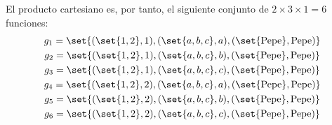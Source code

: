 \documentclass[fc]{tarea}
\begin{document}
\begin{tasks}
    El producto cartesiano es, por tanto, el siguiente conjunto de $2 \times 3 \times 1 = 6$ funciones:
    \begin{gather*}
        g_1 = \set{(\set{1,2}, 1), (\set{a,b,c}, a), (\set{\text{Pepe}}, \text{Pepe})}\\
        g_2 = \set{(\set{1,2}, 1), (\set{a,b,c}, b), (\set{\text{Pepe}}, \text{Pepe})}\\
        g_3 = \set{(\set{1,2}, 1), (\set{a,b,c}, c), (\set{\text{Pepe}}, \text{Pepe})}\\
        g_4 = \set{(\set{1,2}, 2), (\set{a,b,c}, a), (\set{\text{Pepe}}, \text{Pepe})}\\
        g_5 = \set{(\set{1,2}, 2), (\set{a,b,c}, b), (\set{\text{Pepe}}, \text{Pepe})}\\
        g_6 = \set{(\set{1,2}, 2), (\set{a,b,c}, c), (\set{\text{Pepe}}, \text{Pepe})}
    \end{gather*}

\end{tasks}
\end{document}
